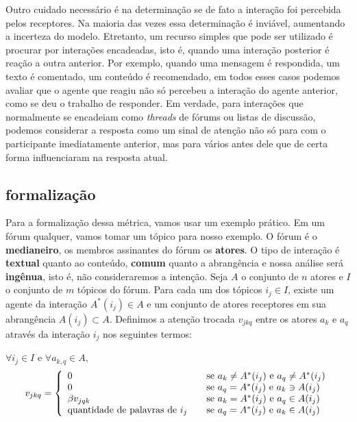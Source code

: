 \documentclass{article}
\begin{document}
Outro cuidado necessário é na determinação se de fato a interação foi percebida
pelos receptores. Na maioria das vezes essa determinação é inviável, aumentando
a incerteza do modelo. Etretanto, um recurso simples que pode ser utilizado é
procurar por interações encadeadas, isto é, quando uma interação posterior é 
reação a outra anterior. Por exemplo, quando uma mensagem é respondida, um texto
é comentado, um conteúdo é recomendado, em todos esses casos podemos avaliar que
o agente que reagiu não só percebeu a interação do agente anterior, como se deu
o trabalho de responder. Em verdade, para interações que normalmente se
encadeiam como \textit{threads} de fórums ou listas de discussão, podemos
considerar a resposta como um sinal de atenção não só para com o participante
imediatamente anterior, mas para vários antes dele que de certa forma
influenciaram na resposta atual.

\subsection{formalização}
Para a formalização dessa métrica, vamos usar um exemplo prático. Em um fórum
qualquer, vamos tomar um tópico para nosso exemplo. O fórum é o
\textbf{medianeiro}, os membros assinantes do fórum os \textbf{atores}. O tipo
de interação é \textbf{textual} quanto ao conteúdo, \textbf{comum} quanto a
abrangência e nossa análise será \textbf{ingênua}, isto é, não consideraremos a
intenção. Seja $A$ o conjunto de $n$ atores e $I$ o conjunto de $m$ tópicos
do fórum. Para cada um dos tópicos $i_j \in I$, existe um agente da interação
$A^*(i_j) \in A$ e um conjunto de atores receptores em sua abrangência $A(i_j)
\subset A$. Definimos a atenção trocada $v_{jkq}$ entre os atores $a_k$ e $a_q$
através da interação $i_j$ nos seguintes termos:

$\forall i_j \in I$ e $\forall a_{k,q} \in A$,
\begin{equation}
\label{def:atencao}
v_{jkq} = \left\{ 
\begin{array}{l l}
  0 & \quad \text{se $a_k \neq A^*(i_j)$ e $a_q \neq A^*(i_j)$}\\
  0 & \quad \text{se $a_q =A^*(i_j)$ e $a_k \ni A(i_j)$}\\
  \beta v_{jqk} & \quad \text{se $a_k=A^*(i_j)$ e $a_q \in A(i_j)$}\\
  \text{quantidade de palavras de $i_j$} & \quad \text{se $a_q=A^*(i_j)$ e $a_k
  \in A(i_j)$} \end{array} \right.
\end{equation}
 
\end{document}
